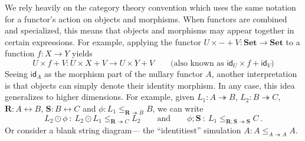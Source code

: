 \documentclass[acmsmall,screen,review,anonymous]{acmart}
\newcommand{\kw}[1]{\ensuremath{ \mathsf{#1} }}
\begin{document}

\begin{remark} %
We rely heavily on the category theory convention
which uses the same notation for
a functor's action on objects and morphisms.
When functors are combined and specialized,
this means that objects and morphisms
may appear together in certain expressions.
For example,
applying the functor $U \times {-} + V : \mathbf{Set} \rightarrow \mathbf{Set}$
to a function $f : X \rightarrow Y$ yields
\[
  U \times f + V : U \times X + V \rightarrow U \times Y + V
  \qquad \text{(also known as }
  \kw{id}_U \times f + \kw{id}_V
  \text{)}
\]
Seeing $\kw{id}_A$ as the morphism part of the nullary functor $A$,
another interpretation is that
objects can simply denote their identity morphism.
%
In any case,
this idea generalizes to higher dimensions.
For example, given
$L_1 : A \twoheadrightarrow B$,
$L_2 : B \twoheadrightarrow C$,
$\mathbf{R} : A \leftrightarrow B$,
$\mathbf{S} : B \leftrightarrow C$ and
$\phi : L_1 \le_{\mathbf{R} \twoheadrightarrow B} B$,
we can write
\[
  L_2 \odot \phi \: : \:
  L_2 \odot L_1 \le_{\mathbf{R} \twoheadrightarrow C} L_2
  \qquad \text{and} \qquad
  \phi \mathbin; \mathbf{S} \: : \:
  L_1 \le_{\mathbf{R} \mathbin; \mathbf{S} \twoheadrightarrow \mathbf{S}} C
  \,.
\]
Or consider a blank string diagram---%
the ``identitiest'' simulation
$A : A \le_{A \twoheadrightarrow A} A$.
\end{remark}
\end{document}
